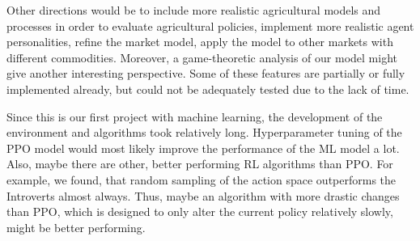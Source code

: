 \documentclass[a4paper,12pt]{article} %
\begin{document}
Other directions would be to include more realistic agricultural models and processes in order to evaluate agricultural policies, implement more realistic agent personalities, refine the market model, apply the model to other markets with different commodities. Moreover, a game-theoretic analysis of our model might give another interesting perspective. Some of these features are partially or fully implemented already, but could not be adequately tested due to the lack of time.


Since this is our first project with machine learning, the development of the environment and algorithms took relatively long. Hyperparameter tuning of the PPO model would most likely improve the performance of the ML model a lot. Also, maybe there are other, better performing RL algorithms than PPO. For example, we found, that random sampling of the action space outperforms the Introverts almost always. Thus, maybe an algorithm with more drastic changes than PPO, which is designed to only alter the current policy relatively slowly, might be better performing.  





                     
\end{document}
